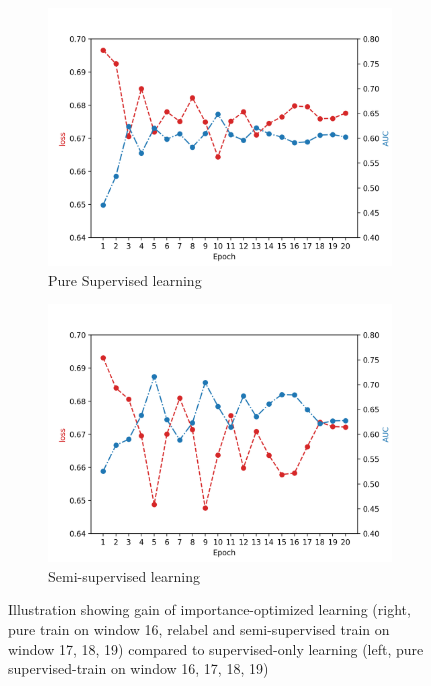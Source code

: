 \begin{figure}[htbp!]
     \centering
     \begin{subfigure}[b]{0.49\textwidth}
         \centering
         \includegraphics[width=\textwidth]{images/evaluation/Figure_16171819pure_epoch20.png}
         \caption{Pure Supervised learning}
         \label{fig:16171819pure}
     \end{subfigure}
     \hfill
     \begin{subfigure}[b]{0.49\textwidth}
         \centering
         \includegraphics[width=\textwidth]{images/evaluation/Figure_16pure_171819dirty.png}
         \caption{Semi-supervised learning}
         \label{fig:16pure_171819dirty}
     \end{subfigure}
    \caption{Illustration showing gain of importance-optimized learning (right, pure train on window 16, relabel and semi-supervised train on window 17, 18, 19) compared to supervised-only learning (left, pure supervised-train on window 16, 17, 18, 19)}
    \label{fig:comparison_dirty}
\end{figure}

